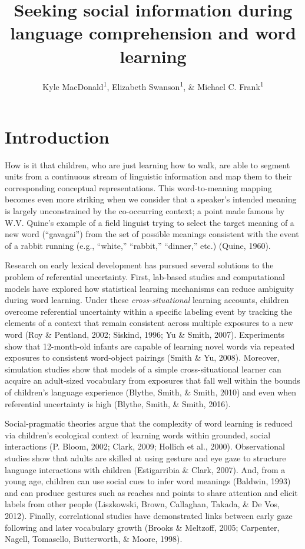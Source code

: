 \documentclass[man,floatsintext]{apa6}
\title{Seeking social information during language comprehension and word
learning}
\author{Kyle MacDonald\textsuperscript{1}, Elizabeth Swanson\textsuperscript{1},
\& Michael C. Frank\textsuperscript{1}}
\date{}
\affiliation{
\vspace{0.5cm}
\textsuperscript{1} Stanford University}
\begin{document}
\maketitle

\section{Introduction}\label{introduction}

How is it that children, who are just learning how to walk, are able to
segment units from a continuous stream of linguistic information and map
them to their corresponding conceptual representations. This
word-to-meaning mapping becomes even more striking when we consider that
a speaker's intended meaning is largely unconstrained by the
co-occurring context; a point made famous by W.V. Quine's example of a
field linguist trying to select the target meaning of a new word
(\enquote{gavagai}) from the set of possible meanings consistent with
the event of a rabbit running (e.g., \enquote{white,} \enquote{rabbit,}
\enquote{dinner,} etc.) (Quine, 1960).

Research on early lexical development has pursued several solutions to
the problem of referential uncertainty. First, lab-based studies and
computational models have explored how statistical learning mechanisms
can reduce ambiguity during word learning. Under these
\emph{cross-situational} learning accounts, children overcome
referential uncertainty within a specific labeling event by tracking the
elements of a context that remain consistent across multiple exposures
to a new word (Roy \& Pentland, 2002; Siskind, 1996; Yu \& Smith, 2007).
Experiments show that 12-month-old infants are capable of learning novel
words via repeated exposures to consistent word-object pairings (Smith
\& Yu, 2008). Moreover, simulation studies show that models of a simple
cross-situational learner can acquire an adult-sized vocabulary from
exposures that fall well within the bounds of children's language
experience (Blythe, Smith, \& Smith, 2010) and even when referential
uncertainty is high (Blythe, Smith, \& Smith, 2016).

Social-pragmatic theories argue that the complexity of word learning is
reduced via children's ecological context of learning words within
grounded, social interactions (P. Bloom, 2002; Clark, 2009; Hollich et
al., 2000). Observational studies show that adults are skilled at using
gesture and eye gaze to structure language interactions with children
(Estigarribia \& Clark, 2007). And, from a young age, children can use
social cues to infer word meanings (Baldwin, 1993) and can produce
gestures such as reaches and points to share attention and elicit labels
from other people (Liszkowski, Brown, Callaghan, Takada, \& De Vos,
2012). Finally, correlational studies have demonstrated links between
early gaze following and later vocabulary growth (Brooks \& Meltzoff,
2005; Carpenter, Nagell, Tomasello, Butterworth, \& Moore, 1998).
\end{document}
